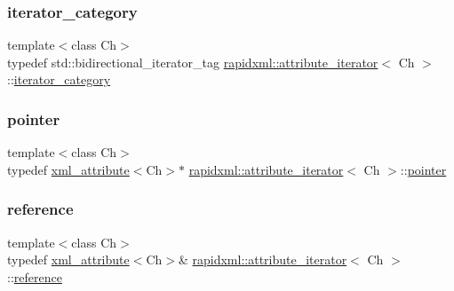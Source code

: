 \subsubsection{\texorpdfstring{iterator\_category}{iterator\_category}}
{\footnotesize\ttfamily template$<$class Ch$>$ \\
typedef std\+::bidirectional\+\_\+iterator\+\_\+tag \mbox{\hyperlink{classrapidxml_1_1attribute__iterator}{rapidxml\+::attribute\+\_\+iterator}}$<$ Ch $>$\+::\mbox{\hyperlink{classrapidxml_1_1attribute__iterator_a97ac5d8b98f5b03c68cc566f5ac0a9e0}{iterator\+\_\+category}}}

\mbox{\label{classrapidxml_1_1attribute__iterator_a69acc2e60270d6a062c03c9cb1cf2aa7}} 
\subsubsection{\texorpdfstring{pointer}{pointer}}
{\footnotesize\ttfamily template$<$class Ch$>$ \\
typedef \mbox{\hyperlink{classrapidxml_1_1xml__attribute}{xml\+\_\+attribute}}$<$Ch$>$$\ast$ \mbox{\hyperlink{classrapidxml_1_1attribute__iterator}{rapidxml\+::attribute\+\_\+iterator}}$<$ Ch $>$\+::\mbox{\hyperlink{classrapidxml_1_1attribute__iterator_a69acc2e60270d6a062c03c9cb1cf2aa7}{pointer}}}

\mbox{\label{classrapidxml_1_1attribute__iterator_a097343e44557de14de86b470d3f917d9}} 
\subsubsection{\texorpdfstring{reference}{reference}}
{\footnotesize\ttfamily template$<$class Ch$>$ \\
typedef \mbox{\hyperlink{classrapidxml_1_1xml__attribute}{xml\+\_\+attribute}}$<$Ch$>$\& \mbox{\hyperlink{classrapidxml_1_1attribute__iterator}{rapidxml\+::attribute\+\_\+iterator}}$<$ Ch $>$\+::\mbox{\hyperlink{classrapidxml_1_1attribute__iterator_a097343e44557de14de86b470d3f917d9}{reference}}}

